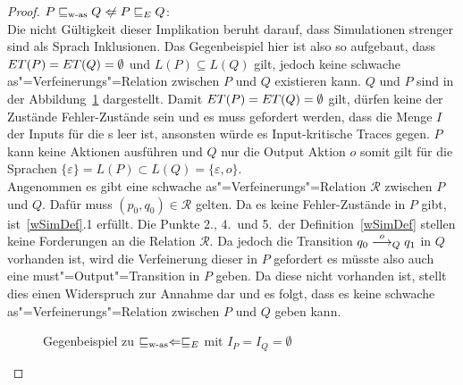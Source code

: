 \begin{proof}
  $P\wasRel Q\hspace{0.1cm}\not\hspace{-0.1cm}\Leftarrow P\ERel Q$:\\
  Die nicht Gültigkeit dieser Implikation beruht darauf, dass Simulationen
  strenger sind als Sprach Inklusionen. Das Gegenbeispiel hier ist also so
  aufgebaut, dass $ET (P) =ET (Q) = \emptyset$ und $L(P) \subseteq L(Q)$
  gilt, jedoch keine schwache as"=Verfeinerungs"=Relation zwischen $P$ und $Q$
  existieren kann. $Q$ und $P$ sind in der Abbildung~\ref{WasEGegenBsp}
  dargestellt. Damit $ET (P) =ET (Q) = \emptyset$ gilt, dürfen keine der
  Zustände Fehler-Zustände sein und es muss gefordert werden, dass die Menge
  $I$ der Inputs für die \MEIO{}s leer ist, ansonsten würde es Input-kritische
  Traces gegen. $P$ kann keine Aktionen ausführen und $Q$ nur die Output Aktion
  $o$ somit gilt für die Sprachen $\{\varepsilon\} = L(P) \subset L(Q) =
  \{\varepsilon , o\}$.\\
  Angenommen es gibt eine schwache as"=Verfeinerungs"=Relation $\mathcal{R}$
  zwischen $P$ und $Q$. Dafür muss $(p_0,q_0)\in \mathcal{R}$ gelten. Da es
  keine Fehler-Zustände in $P$ gibt, ist~\ref{wSimDef}.1 erfüllt. Die
  Punkte 2., 4.\ und 5.\ der Definition~\ref{wSimDef} stellen keine
  Forderungen an die Relation $\mathcal{R}$. Da jedoch die Transition $q_0
  \must[o]_Q q_1$ in $Q$ vorhanden ist, wird die Verfeinerung dieser in $P$
  gefordert es müsste also auch eine must"=Output"=Transition in $P$ geben. Da
  diese nicht vorhanden ist, stellt dies einen Widerspruch zur Annahme dar und
  es folgt, dass es keine schwache as"=Verfeinerungs"=Relation zwischen $P$ und
  $Q$ geben kann.

  \begin{figure}[htbp]
    \begin{center}
      \caption{Gegenbeispiel zu $\sqsubseteq _{\mathrm{w}\text{-}\mathrm{as}} \Leftarrow  \sqsubseteq  _E$ mit $I_P = I_Q =
      \emptyset$}
      \label{WasEGegenBsp}
    \end{center}
  \end{figure}
\end{proof}

